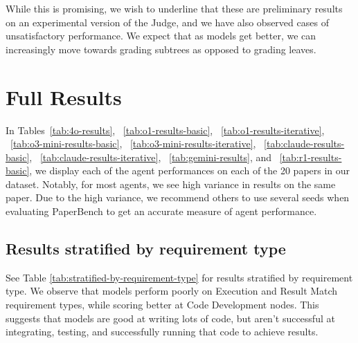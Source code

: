 \documentclass{article}
\theoremstyle{plain}
\theoremstyle{definition}
\theoremstyle{remark}
\begin{document}
While this is promising, we wish to underline that these are preliminary results on an experimental version of the Judge, and we have also observed cases of unsatisfactory performance. We expect that as models get better, we can increasingly move towards grading subtrees as opposed to grading leaves.


\section{Full Results}
\label{app:full-results}

In Tables~\ref{tab:4o-results}, ~\ref{tab:o1-results-basic}, ~\ref{tab:o1-results-iterative}, ~\ref{tab:o3-mini-results-basic}, ~\ref{tab:o3-mini-results-iterative}, ~\ref{tab:claude-results-basic}, ~\ref{tab:claude-results-iterative}, ~\ref{tab:gemini-results}, and ~\ref{tab:r1-results-basic}, we display each of the agent performances on each of the 20 papers in our dataset. Notably, for most agents, we see high variance in results on the same paper. Due to the high variance, we recommend others to use several seeds when evaluating PaperBench to get an accurate measure of agent performance.

\subsection{Results stratified by requirement type}

See Table \ref{tab:stratified-by-requirement-type} for results stratified by requirement type. We observe that models perform poorly on Execution and Result Match requirement types, while scoring better at Code Development nodes. This suggests that models are good at writing lots of code, but aren't successful at integrating, testing, and successfully running that code to achieve results.
\end{document}
